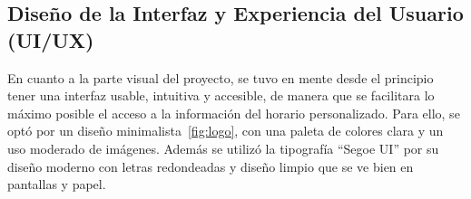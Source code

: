 \subsection{Diseño de la Interfaz y Experiencia del Usuario (UI/UX)}

En cuanto a la parte visual del proyecto, se tuvo en mente desde el principio tener una interfaz usable, intuitiva y accesible, de manera que se facilitara lo máximo posible el acceso a la información del horario personalizado.
\newline\newline
Para ello, se optó por un diseño minimalista~\ref{fig:logo}, con una paleta de colores clara y un uso moderado de imágenes. Además se utilizó la tipografía ``Segoe UI'' por su diseño moderno con letras redondeadas y diseño limpio que se ve bien en pantallas y papel.
\newline
